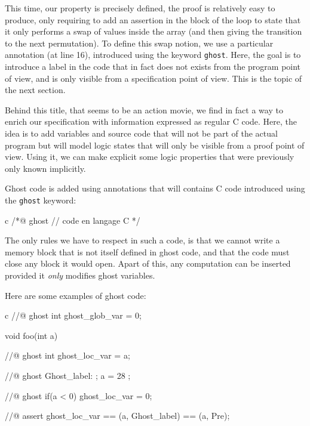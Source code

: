 \documentclass[middle]{zmdocument}
\begin{document}
This time, our property is precisely defined, the proof is relatively
easy to produce, only requiring to add an assertion in the block of the
loop to state that it only performs a swap of values inside the array
(and then giving the transition to the next permutation). To define this
swap notion, we use a particular annotation (at line 16), introduced
using the keyword \texttt{ghost}. Here, the goal is to introduce a label
in the code that in fact does not exists from the program point of view,
and is only visible from a specification point of view. This is the
topic of the next section.





Behind this title, that seems to be an action movie, we find in fact a
way to enrich our specification with information expressed as regular C
code. Here, the idea is to add variables and source code that will not
be part of the actual program but will model logic states that will only
be visible from a proof point of view. Using it, we can make explicit
some logic properties that were previously only known implicitly.




Ghost code is added using annotations that will contains C code
introduced using the \texttt{ghost} keyword:



\begin{CodeBlock}{c}
/*@
  ghost
  // code en langage C
*/
\end{CodeBlock}



The only rules we have to respect in such a code, is that we cannot
write a memory block that is not itself defined in ghost code, and that
the code must close any block it would open. Apart of this, any
computation can be inserted provided it \emph{only} modifies ghost
variables.




Here are some examples of ghost code:



\begin{CodeBlock}{c}
//@ ghost int ghost_glob_var = 0;

void foo(int a){
  //@ ghost int ghost_loc_var = a;

  //@ ghost Ghost_label: ;
  a = 28 ;

  //@ ghost if(a < 0){ ghost_loc_var = 0; }

  //@ assert ghost_loc_var == \at(a, Ghost_label) == \at(a, Pre);
}
\end{CodeBlock}
\end{document}
